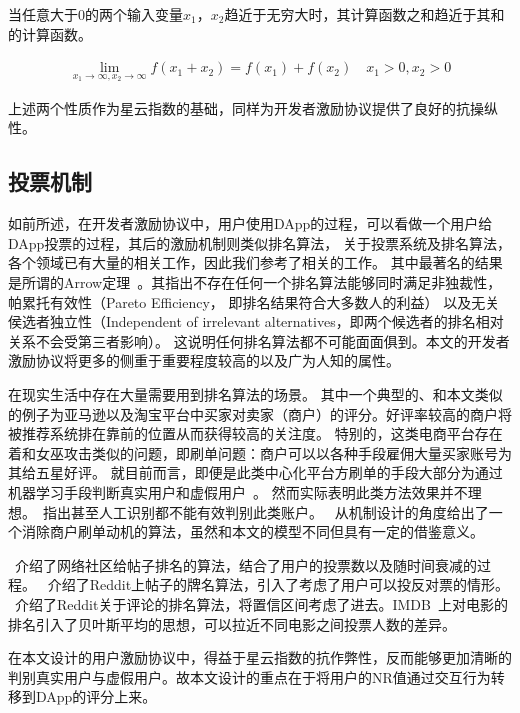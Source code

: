 \begin{property}
\label{prop:two}
当任意大于$0$的两个输入变量$x_1$，$x_2$趋近于无穷大时，其计算函数之和趋近于其和的计算函数。
\end{property}
\begin{align}
\lim\limits_{x_1 \to \infty, x_2\to \infty} f(x_1+x_2) = f(x_1) + f(x_2)\quad x_1>0, x_2>0
\end{align}

\noindent 上述两个性质作为星云指数的基础，同样为开发者激励协议提供了良好的抗操纵性。

\subsection{投票机制}
如前所述，在开发者激励协议中，用户使用DApp的过程，可以看做一个用户给DApp投票的过程，其后的激励机制则类似排名算法，
关于投票系统及排名算法，各个领域已有大量的相关工作，因此我们参考了相关的工作。
其中最著名的结果是所谓的Arrow定理~\cite{arrow1951extension}。其指出不存在任何一个排名算法能够同时满足非独裁性，帕累托有效性（Pareto Efficiency， 即排名结果符合大多数人的利益）
以及无关侯选者独立性（Independent of irrelevant alternatives，即两个候选者的排名相对关系不会受第三者影响）。
这说明任何排名算法都不可能面面俱到。本文的开发者激励协议将更多的侧重于重要程度较高的以及广为人知的属性。

在现实生活中存在大量需要用到排名算法的场景。
其中一个典型的、和本文类似的例子为亚马逊以及淘宝平台中买家对卖家（商户）的评分。好评率较高的商户将被推荐系统排在靠前的位置从而获得较高的关注度。
特别的，这类电商平台存在着和女巫攻击类似的问题，即刷单问题：商户可以以各种手段雇佣大量买家账号为其给五星好评。
就目前而言，即便是此类中心化平台方刷单的手段大部分为通过机器学习手段判断真实用户和虚假用户~\cite{mukherjee2013spotting,jindal2008opinion,yoo2009comparison}。
然而实际表明此类方法效果并不理想。~\cite{ott2011finding}指出甚至人工识别都不能有效判别此类账户。
~\cite{cai2016mechanism}从机制设计的角度给出了一个消除商户刷单动机的算法，虽然和本文的模型不同但具有一定的借鉴意义。


~\cite{salihefendic2010hacker}介绍了网络社区给帖子排名的算法，结合了用户的投票数以及随时间衰减的过程。
~\cite{salihefendic2010reddit}介绍了Reddit上帖子的牌名算法，引入了考虑了用户可以投反对票的情形。
~\cite{miller2009how}介绍了Reddit关于评论的排名算法，将置信区间考虑了进去。IMDB~\cite{IMDB}上对电影的排名引入了贝叶斯平均的思想，可以拉近不同电影之间投票人数的差异。

在本文设计的用户激励协议中，得益于星云指数的抗作弊性，反而能够更加清晰的判别真实用户与虚假用户。故本文设计的重点在于将用户的NR值通过交互行为转移到DApp的评分上来。



